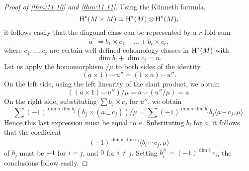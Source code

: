 \documentclass[../main]{subfiles}
\begin{document}
\begin{proof}[Proof of \ref{thm:11.10} and \ref{thm:11.11}]
Using the K\"{u}nneth formula,
\[
\operatorname{H}^\ast(M\times M) \cong \operatorname{H}^\ast(M) \otimes \operatorname{H}^\ast(M), 
\]
it follows easily that the diagonal class can be represented by a $r$-fold sum
\[
u^{\prime\prime} = b_1 \times c_1 + \dots + b_r \times c_r,
\]
where $c_1,\dots, c_r$ are certain well-defined cohomology classes in $\operatorname{H}^\ast(M)$ with
\[
\dim{b_i} + \dim{c_i} = n.
\]
Let us apply the homomorphism $/\mu$ to both sides of the identity
\[
(a\times 1) \smile u'' = (1\times a)\smile u''.
\]
On the left side, using the left linearity of the slant product, we obtain
\[
((a\times 1)\smile u'') / \mu
=
a \smile (u''/\mu)=a.
\]
On the right side, substituting $\sum b_j\times c_j$ for $u''$, we obtain
\[
\sum (-1)^{\dim a \, \dim b_j} (b_j \times (a\smile c_j))/\mu
=
\sum (-1)^{\dim a \, \dim b_j} b_j \langle a\smile c_j, \mu \rangle.
\]
Hence this last expression must be equal to $a$. Substituting $b_i$ for $a$, it follows that the coefficient
\[
(-1)^{\dim a \, \dim b_j} \langle b_i\smile c_j, \mu \rangle
\]
of $b_j$ must be $+1$ for $i=j$, and $0$ for $i\neq j$. Setting $b_i^\# = (-1)^{\dim b_i} c_i$, the conclusions follow easily.
\end{proof}
\end{document}
